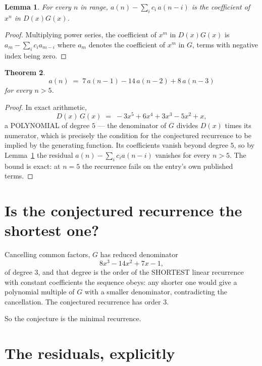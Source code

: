 \documentclass[11pt,a4paper]{article}
\theoremstyle{plain}
\newtheorem{theorem}{Theorem}
\newtheorem{lemma}[theorem]{Lemma}
\theoremstyle{definition}
\begin{document}
\begin{lemma}\label{lem:key}
For every $n$ in range, $a(n)-\sum_i c_i\,a(n-i)$ is the coefficient of $x^{n}$ in
$D(x)G(x)$.
\end{lemma}

\begin{proof}
Multiplying power series, the coefficient of $x^{m}$ in $D(x)G(x)$ is
$a_m-\sum_i c_i a_{m-i}$ where $a_m$ denotes the coefficient of $x^{m}$ in $G$, terms with
negative index being zero.
\end{proof}

\begin{theorem}
\[
a(n)\;=\;7\,a(n-1) - 14\,a(n-2) + 8\,a(n-3)
\]
for every $n>5$.
\end{theorem}

\begin{proof}
In exact arithmetic,
\[
D(x)\,G(x)\;=\;- 3 x^{5} + 6 x^{4} + 3 x^{3} - 5 x^{2} + x,
\]
a POLYNOMIAL of degree $5$ --- the denominator of $G$ divides $D(x)$ times its numerator,
which is precisely the condition for the conjectured recurrence to be implied by the
generating function. Its coefficients vanish beyond degree $5$, so by
Lemma~\ref{lem:key} the residual $a(n)-\sum_ic_ia(n-i)$ vanishes for every
$n>5$. The bound is exact: at $n=5$ the recurrence fails on the entry's own published terms.
\end{proof}

\section{Is the conjectured recurrence the shortest one?}

Cancelling common factors, $G$ has reduced denominator
\[
8 x^{3} - 14 x^{2} + 7 x - 1,
\]
of degree $3$, and that degree is the order of the SHORTEST linear recurrence with
constant coefficients the sequence obeys: any shorter one would give a polynomial multiple of
$G$ with a smaller denominator, contradicting the cancellation. The conjectured recurrence has
order $3$.

So the conjecture is the minimal recurrence.

\section{The residuals, explicitly}
\end{document}
